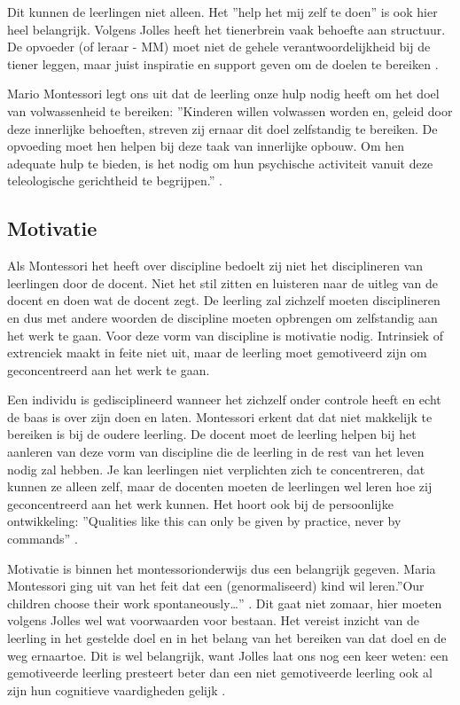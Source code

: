 \documentclass[12pt, a4paper]{article}
\begin{document}
Dit kunnen de leerlingen niet alleen. Het ''help het mij zelf te doen'' is ook hier heel belangrijk. Volgens Jolles heeft het tienerbrein vaak behoefte aan structuur. De opvoeder (of leraar - MM) moet niet de gehele verantwoordelijkheid bij de tiener leggen, maar juist inspiratie en support geven om de doelen te bereiken \cite[p.167]{jolles}.

Mario Montessori legt ons uit dat de leerling onze hulp nodig heeft om het doel van volwassenheid te bereiken: ''Kinderen willen volwassen worden en, geleid door deze innerlijke behoeften, streven zij ernaar dit doel zelfstandig te bereiken. De opvoeding moet hen helpen bij deze taak van innerlijke opbouw. Om hen adequate hulp te bieden, is het nodig om hun psychische activiteit vanuit deze teleologische gerichtheid te begrijpen.'' \cite[p. 60]{Mario}.

\subsection{Motivatie}
Als Montessori het heeft over discipline bedoelt zij niet het disciplineren van leerlingen door de docent. Niet het stil zitten en luisteren naar de uitleg van de docent en doen wat de docent zegt. De leerling zal zichzelf moeten disciplineren en dus met andere woorden de discipline moeten opbrengen om zelfstandig aan het werk te gaan. Voor deze vorm van discipline is motivatie nodig. Intrinsiek of extrenciek maakt in feite niet uit, maar de leerling moet gemotiveerd zijn om geconcentreerd aan het werk te gaan.

Een individu is gedisciplineerd wanneer het zichzelf onder controle heeft en echt de baas is over zijn doen en laten.
Montessori erkent dat dat niet makkelijk te bereiken is bij de oudere leerling. De docent moet de leerling helpen bij het aanleren van deze vorm van discipline die de leerling in de rest van het leven nodig zal hebben. \cite{Montessori2017}
Je kan leerlingen niet verplichten zich te concentreren, dat kunnen ze alleen zelf, maar de docenten moeten de leerlingen wel leren hoe zij geconcentreerd aan het werk kunnen. Het hoort ook bij de persoonlijke ontwikkeling: ''Qualities like this can only be given by practice, never by commands'' \cite[pp. 187-188]{Montessori2016}.

Motivatie is binnen het montessorionderwijs dus een belangrijk gegeven. Maria Montessori ging uit van het feit dat een (genormaliseerd) kind wil leren.''Our children choose their work spontaneously\dots'' \cite[p.47]{Gimbel}. Dit gaat niet zomaar, hier moeten volgens Jolles wel wat voorwaarden voor bestaan. Het vereist inzicht van de leerling in het gestelde doel en in het belang van het bereiken van dat doel en de weg ernaartoe. Dit is wel belangrijk, want Jolles laat ons nog een keer weten: een gemotiveerde leerling presteert beter dan een niet gemotiveerde leerling ook al zijn hun cognitieve vaardigheden gelijk \cite[p.151]{jolles}. 
\end{document}
